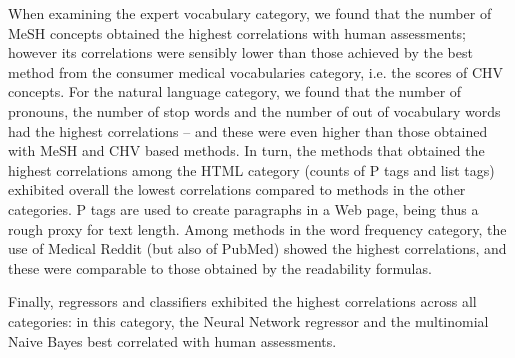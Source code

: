 When examining the expert vocabulary category, we found that the number of MeSH concepts obtained the highest correlations with human assessments; however its correlations were sensibly lower than those achieved by the best method from the consumer medical vocabularies category, i.e. the scores of CHV concepts. For the natural language category, we found that the number of pronouns, the number of stop words and the number of out of vocabulary words had the highest correlations -- and these were even higher than those obtained with MeSH and CHV based methods. In turn, the methods that obtained the highest correlations among the HTML category (counts of P tags and list tags) exhibited overall the lowest correlations compared to methods in the other categories. P tags are used to create paragraphs in a Web page, being thus a rough proxy for text length. 
Among methods in the word frequency category, the use of Medical Reddit (but also of PubMed) showed the highest correlations, and these were comparable to those obtained by the readability formulas. 



Finally, regressors and classifiers exhibited the highest correlations across all categories: in this  category, the  Neural Network regressor and the multinomial Naive Bayes best correlated with human assessments. 



%

%


